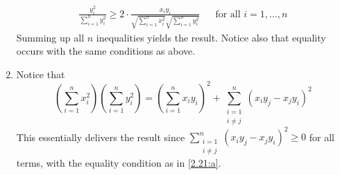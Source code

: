 \begin{solution}
\begin{enumerate}[label=(\alph*)]
\begin{align*}
      \frac{y_i^2}{\sum_{i=1}^n y_i^2} \geq
      2 \cdot \frac{x_i y_i}{\sqrt{\sum_{i=1}^n x_i^2}%
      \sqrt{\sum_{i=1}^n y_i^2}} &&
      \text{for all $i=1,\ldots,n$}
    \end{align*}
    Summing up all $n$ inequalities yields the result.
    Notice also that equality occurs with the same
    conditions as above.
    \item {} Notice that
    \begin{equation*}
      \left(\sum_{i=1}^n x_i^2\right)
      \left(\sum_{i=1}^n y_i^2\right) =
      \left(\sum_{i=1}^n x_i y_i\right)^2 +
      \sum_{\substack{i=1 \\ i\neq j}}^n
      \left(x_i y_j - x_j y_i\right)^2
    \end{equation*}
    This essentially delivers the result since
    $\sum_{\substack{i=1 \\ i\neq j}}^n
    \left(x_i y_j - x_j y_i\right)^2 \geq 0$
    for all terms, with the
    equality condition as in \ref{2.21:a}.
  \end{enumerate}
\end{solution}
